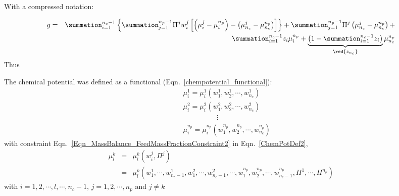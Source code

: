 With a compressed notation:

\begin{eqnarray}
g &=& \summation_{i=1}^{n_{c}-1}\left\{\summation_{j=1}^{n_{p}-1}\Pi^{j}w_{i}^{j}\left[\left(\mu_{i}^{j}-\mu_{i}^{n_{p}}\right) - \left(\mu_{n_{c}}^{j}-\mu_{n_{c}}^{n_{p}}\right)\right]\right\} + \summation_{j=1}^{n_{p}-1}\Pi^{j}\left(\mu_{n_{c}}^{j}-\mu_{n_{c}}^{n_{p}}\right) +  \nonumber \\
&& \hspace{3cm} \summation_{i=1}^{n_{c}-1} z_{i}\mu_{i}^{n_{p}} + \underbrace{\left(1-\summation_{i=1}^{n_{c}-1}z_{i}\right)}_{\red{z_{n_{c}}}}\mu_{n_{c}}^{n_{p}} \nonumber 
\end{eqnarray}
Thus

The chemical potential was defined as a functional (Eqn.~\ref{chempotential_functional}):
\begin{eqnarray}
&& \mu_{i}^{1} = \mu_{i}^{1}\left(w_{1}^{1},w_{2}^{1},\cdots,w_{n_{c}}^{1}\right) \nonumber \\
&& \mu_{i}^{2} = \mu_{i}^{2}\left(w_{1}^{2},w_{2}^{2},\cdots,w_{n_{c}}^{2}\right) \nonumber \\
&& \hspace{2cm}\vdots \nonumber \\
&& \mu_{i}^{n_{p}} = \mu_{i}^{n_{p}}\left(w_{1}^{n_{p}},w_{2}^{n_{p}},\cdots,w_{n_{c}}^{n_{p}}\right) \label{ChemPotDef2}
\end{eqnarray}
with constraint Eqn.~\ref{Eqn_MassBalance_FeedMassFractionConstraint2} in Eqn.~\ref{ChemPotDef2},
\begin{eqnarray}
\mu_{l}^{k} &=& \mu_{l}^{k}\left(w_{i}^{j},\Pi^{j}\right) \nonumber \\
           &=& \mu_{l}^{k}\left(w_{1}^{1},\cdots,w_{n_{c}-1}^{1},w_{1}^{2},\cdots,w_{n_{c}-1}^{2},\cdots,w_{1}^{n_{p}},w_{2}^{n_{p}},\cdots,w_{n_{c}-1}^{n_{p}},\Pi^{1},\cdots,\Pi^{n_{p}}\right)\nonumber
\end{eqnarray}
with $i = 1, 2, \cdots, l, \cdots, n_{c} - 1$, $j = 1, 2, \cdots, n_{p}$ and $j\neq k$

